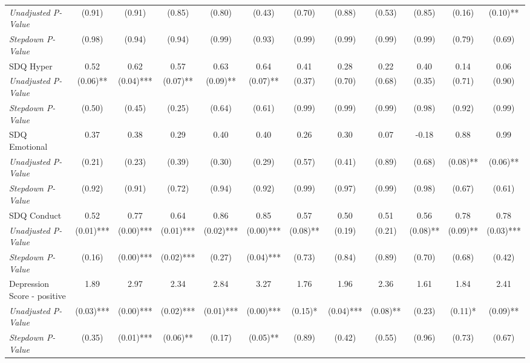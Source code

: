 \begin{tabular}{l c c c c c c c c c c c}
\quad \textit{Unadjusted P-Value} & (0.91) & (0.91) & (0.85) & (0.80) & (0.43) & (0.70) & (0.88) & (0.53) & (0.85) & (0.16) & (0.10)** \\
\quad \textit{Stepdown P-Value} & (0.98) & (0.94) & (0.94) & (0.99) & (0.93) & (0.99) & (0.99) & (0.99) & (0.99) & (0.79) & (0.69) \\
SDQ Hyper & 0.52 & 0.62 & 0.57 & 0.63 & 0.64 & 0.41 & 0.28 & 0.22 & 0.40 & 0.14 & 0.06 \\
\quad \textit{Unadjusted P-Value} & (0.06)** & (0.04)*** & (0.07)** & (0.09)** & (0.07)** & (0.37) & (0.70) & (0.68) & (0.35) & (0.71) & (0.90) \\
\quad \textit{Stepdown P-Value} & (0.50) & (0.45) & (0.25) & (0.64) & (0.61) & (0.99) & (0.99) & (0.99) & (0.98) & (0.92) & (0.99) \\
SDQ Emotional & 0.37 & 0.38 & 0.29 & 0.40 & 0.40 & 0.26 & 0.30 & 0.07 & -0.18 & 0.88 & 0.99 \\
\quad \textit{Unadjusted P-Value} & (0.21) & (0.23) & (0.39) & (0.30) & (0.29) & (0.57) & (0.41) & (0.89) & (0.68) & (0.08)** & (0.06)** \\
\quad \textit{Stepdown P-Value} & (0.92) & (0.91) & (0.72) & (0.94) & (0.92) & (0.99) & (0.97) & (0.99) & (0.98) & (0.67) & (0.61) \\
SDQ Conduct & 0.52 & 0.77 & 0.64 & 0.86 & 0.85 & 0.57 & 0.50 & 0.51 & 0.56 & 0.78 & 0.78 \\
\quad \textit{Unadjusted P-Value} & (0.01)*** & (0.00)*** & (0.01)*** & (0.02)*** & (0.00)*** & (0.08)** & (0.19) & (0.21) & (0.08)** & (0.09)** & (0.03)*** \\
\quad \textit{Stepdown P-Value} & (0.16) & (0.00)*** & (0.02)*** & (0.27) & (0.04)*** & (0.73) & (0.84) & (0.89) & (0.70) & (0.68) & (0.42) \\
Depression Score - positive & 1.89 & 2.97 & 2.34 & 2.84 & 3.27 & 1.76 & 1.96 & 2.36 & 1.61 & 1.84 & 2.41 \\
\quad \textit{Unadjusted P-Value} & (0.03)*** & (0.00)*** & (0.02)*** & (0.01)*** & (0.00)*** & (0.15)* & (0.04)*** & (0.08)** & (0.23) & (0.11)* & (0.09)** \\
\quad \textit{Stepdown P-Value} & (0.35) & (0.01)*** & (0.06)** & (0.17) & (0.05)** & (0.89) & (0.42) & (0.55) & (0.96) & (0.73) & (0.67) \\
\bottomrule
\end{tabular}
